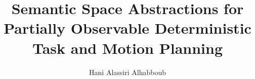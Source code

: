 



\title{Semantic Space Abstractions for Partially Observable Deterministic Task and Motion Planning}
\author{Hani Alassiri Alhabboub}
\date{}

\newcommand\studentid{433422}
\newcommand\degree{Master}
\newcommand\institute{Chair~of~Machine~Learning~and~Reasoning}
\newcommand\supervisor{Till Hofmann, Daniel Swoboda}
\newcommand\firstexaminer{Prof. Hector Geffner, Ph.D.}
\newcommand\secondexaminer{Prof. Christopher Morris}
\newcommand\place{Aachen}




  \frontmatter
  
  
  \tableofcontents

  \mainmatter
  
  
  
  
  
  

  \appendix
  

  \backmatter
  \listacronyms
  \listsymbols
  \listfigures
  \listtables
  \listalgorithms
  \listlistings
  \listreferences
  \listtodos


